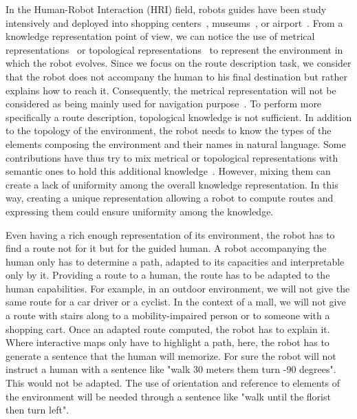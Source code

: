 In the Human-Robot Interaction (HRI) field, robots guides have been study intensively and deployed into shopping centers~\cite{okuno_2009_providing}, museums~\cite{burgard_1999_museum, clodic_2006_rackham, siegwart_2003_robox}, or airport~\cite{triebel_2016_spencer}. From a knowledge representation point of view, we can notice the use of metrical representations~\cite{thrun_2007_simultaneous} or topological representations~\cite{morales_2011_modeling} to represent the environment in which the robot evolves. Since we focus on the route description task, we consider that the robot does not accompany the human to his final destination but rather explains how to reach it. Consequently, the metrical representation will not be considered as being mainly used for navigation purpose~\cite{thrun_2007_simultaneous}. To perform more specifically a route description, topological knowledge is not sufficient. In addition to the topology of the environment, the robot needs to know the types of the elements composing the environment and their names in natural language. Some contributions have thus try to mix metrical or topological representations with semantic ones to hold this additional knowledge~\cite {satake_2015_should, chrastil_2014_cognitive, zender_2008_conceptual}. However, mixing them can create a lack of uniformity among the overall knowledge representation. In this way, creating a unique representation allowing a robot to compute routes and expressing them could ensure uniformity among the knowledge.

Even having a rich enough representation of its environment, the robot has to find a route not for it but for the guided human. A robot accompanying the human only has to determine a path, adapted to its capacities and interpretable only by it. Providing a route to a human, the route has to be adapted to the human capabilities. For example, in an outdoor environment, we will not give the same route for a car driver or a cyclist. In the context of a mall, we will not give a route with stairs along to a mobility-impaired person or to someone with a shopping cart. Once an adapted route computed, the robot has to explain it. Where interactive maps only have to highlight a path, here, the robot has to generate a sentence that the human will memorize. For sure the robot will not instruct a human with a sentence like "walk 30 meters them turn -90 degrees". This would not be adapted. The use of orientation and reference to elements of the environment will be needed through a sentence like "walk until the florist then turn left".


